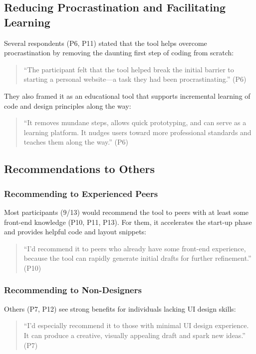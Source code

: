 \subsection{Reducing Procrastination and Facilitating Learning}
Several respondents (P6, P11) stated that the tool helps overcome procrastination by removing the daunting first step of coding from scratch:

\begin{quote}
``The participant felt that the tool helped break the initial barrier to starting a personal website—a task they had been procrastinating.'' (P6)
\end{quote}

They also framed it as an educational tool that supports incremental learning of code and design principles along the way:

\begin{quote}
``It removes mundane steps, allows quick prototyping, and can serve as a learning platform. It nudges users toward more professional standards and teaches them along the way.'' (P6)
\end{quote}

\subsection{Recommendations to Others}
\subsubsection{Recommending to Experienced Peers}
Most participants (9/13) would recommend the tool to peers with at least some front-end knowledge (P10, P11, P13). For them, it accelerates the start-up phase and provides helpful code and layout snippets:

\begin{quote}
``I'd recommend it to peers who already have some front-end experience, because the tool can rapidly generate initial drafts for further refinement.'' (P10)
\end{quote}

\subsubsection{Recommending to Non-Designers}
Others (P7, P12) see strong benefits for individuals lacking UI design skills:

\begin{quote}
``I'd especially recommend it to those with minimal UI design experience. It can produce a creative, visually appealing draft and spark new ideas.'' (P7)
\end{quote}


